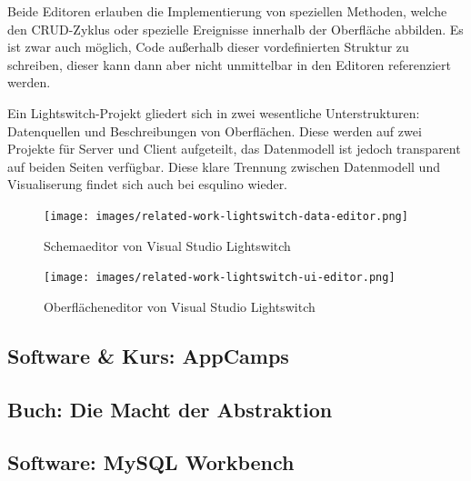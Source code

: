 Beide Editoren erlauben die Implementierung von speziellen Methoden, welche den CRUD-Zyklus oder spezielle Ereignisse innerhalb der Oberfläche abbilden. Es ist zwar auch möglich, Code außerhalb dieser vordefinierten Struktur zu schreiben, dieser kann dann aber nicht unmittelbar in den Editoren referenziert werden.

Ein Lightswitch-Projekt gliedert sich in zwei wesentliche Unterstrukturen: Datenquellen und Beschreibungen von Oberflächen. Diese werden auf zwei Projekte für Server und Client aufgeteilt, das Datenmodell ist jedoch transparent auf beiden Seiten verfügbar. Diese klare Trennung zwischen Datenmodell und Visualiserung findet sich auch bei esqulino wieder.

\begin{figure}[p]
  \centering \texttt{[image: images/related-work-lightswitch-data-editor.png]}
  \caption{Schemaeditor von Visual Studio Lightswitch}
  \label{fig:lightswitch-data-designer}
\end{figure}

\begin{figure}[p]
  \centering \texttt{[image: images/related-work-lightswitch-ui-editor.png]}
  \caption{Oberflächeneditor von Visual Studio Lightswitch}
  \label{fig:lightswitch-ui-designer}
\end{figure}

\subsection{Software \& Kurs: AppCamps}


\subsection{Buch: Die Macht der Abstraktion}



\subsection{Software: MySQL Workbench}


